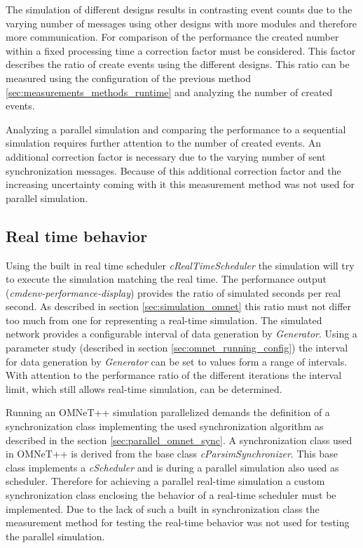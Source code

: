 The simulation of different designs results in contrasting event counts due to the varying number of messages using other designs with more modules and therefore more communication.
For comparison of the performance the created number within a fixed processing time a correction factor must be considered.
This factor describes the ratio of create events using the different designs.
This ratio can be measured using the configuration of the previous method \ref{sec:measurements_methods_runtime} and analyzing the number of created events.

Analyzing a parallel simulation and comparing the performance to a sequential simulation requires further attention to the number of created events.
An additional correction factor is necessary due to the varying number of sent synchronization messages.
Because of this additional correction factor and the increasing uncertainty coming with it this measurement method was not used for parallel simulation.

\subsection{Real time behavior}
\label{sec:measurements_methods_realtime}
Using the built in real time scheduler \emph{cRealTimeScheduler} the simulation will try to execute the simulation matching the real time.
The performance output (\emph{cmdenv-performance-display}) provides the ratio of simulated seconds per real second.
As described in section \ref{sec:simulation_omnet} this ratio must not differ too much from one for representing a real-time simulation.
The simulated network provides a configurable interval of data generation by \emph{Generator}.
Using a parameter study (described in section \ref{sec:omnet_running_config}) the interval for data generation by \emph{Generator} can be set to values form a range of intervals.
With attention to the performance ratio of the different iterations the interval limit, which still allows real-time simulation, can be determined.

Running an OMNeT++ simulation parallelized demands the definition of a synchronization class implementing the used synchronization algorithm as described in the section \ref{sec:parallel_omnet_sync}.
A synchronization class used in OMNeT++ is derived from the base class \emph{cParsimSynchronizer}.
This base class implements a \emph{cScheduler} and is during a parallel simulation also used as scheduler.
Therefore for achieving a parallel real-time simulation a custom synchronization class enclosing the behavior of a real-time scheduler must be implemented.
Due to the lack of such a built in synchronization class the measurement method for testing the real-time behavior was not used for testing the parallel simulation.


